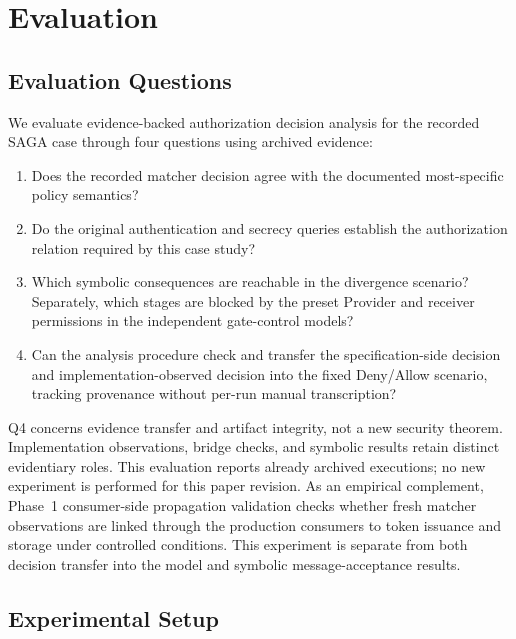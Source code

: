 \section{Evaluation}
\label{sec:evaluation}

\subsection{Evaluation Questions}

We evaluate evidence-backed authorization decision analysis for the recorded
SAGA case through four questions using archived evidence:
\begin{enumerate}
\item[Q1.] Does the recorded matcher decision agree with the documented
most-specific policy semantics?
\item[Q2.] Do the original authentication and secrecy queries establish
the authorization relation required by this case study?
\item[Q3.] Which symbolic consequences are reachable in the divergence
scenario? Separately, which stages are blocked by the preset Provider and
receiver permissions in the independent gate-control models?
\item[Q4.] Can the analysis procedure check and transfer the specification-side
decision and implementation-observed decision into the fixed Deny/Allow
scenario, tracking provenance without per-run manual transcription?
\end{enumerate}
Q4 concerns evidence transfer and artifact integrity, not a new security
theorem. Implementation observations, bridge checks, and symbolic results
retain distinct evidentiary roles. This evaluation reports already archived
executions; no new experiment is performed for this paper revision.
As an empirical complement, Phase~1 consumer-side propagation validation
checks whether fresh matcher observations are linked through the production
consumers to token issuance and storage under controlled conditions. This
experiment is separate from both decision transfer into the model and
symbolic message-acceptance results.

\subsection{Experimental Setup}

